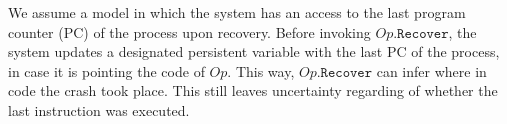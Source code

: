 \color{blue}
We assume a model in which the system has an access to the last program counter (PC) of the process upon recovery. Before invoking $Op.\texttt{Recover}$, the system updates a designated persistent variable with the last PC of the process, in case it is pointing the code of $Op$. This way, $Op.\texttt{Recover}$ can infer where in code the crash took place. This still leaves uncertainty regarding of whether the last instruction was executed.
\color{black}

